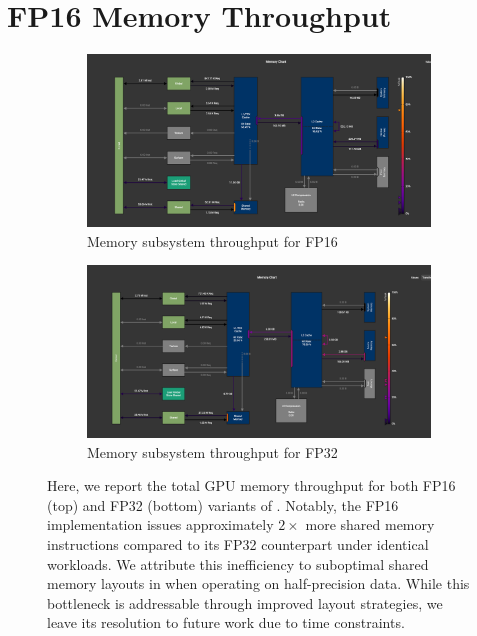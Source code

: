 \chapter{FP16 Memory Throughput}\label{ch:fp16-memory-throughput}
\begin{figure}[!ht]
    \centering
    \begin{subfigure}{\textwidth}
        \centering
        \includegraphics[width=0.9\linewidth, keepaspectratio]{figures/fp16_t}
        \caption{Memory subsystem throughput for FP16}
        \label{sub:fp16}
    \end{subfigure}
    \hfill
    \begin{subfigure}{\textwidth}
        \centering
        \includegraphics[width=0.9\linewidth, keepaspectratio]{figures/fp32_t}
        \caption{Memory subsystem throughput for FP32}
        \label{sub:fp32}
    \end{subfigure}
    \caption{Here, we report the total GPU memory throughput for both FP16 (top) and FP32 (bottom) variants of \sysname.
    Notably, the FP16 implementation issues approximately $2\times$
        more shared memory instructions compared to its FP32 counterpart
        under identical workloads.
        We attribute this inefficiency to
        suboptimal shared memory layouts in \sysname when
        operating on half-precision data.
        While this bottleneck is addressable through improved layout strategies,
        we leave its resolution to future work due to time constraints.}
    \label{fig:mem_t}
\end{figure}